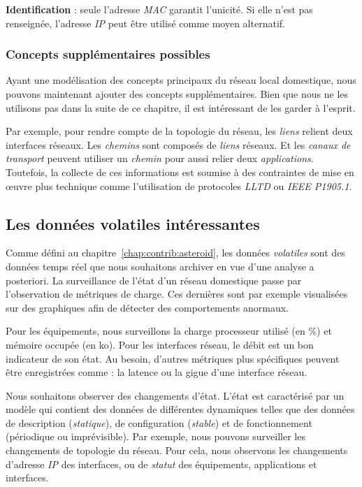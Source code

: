 \textbf{Identification} : seule l'adresse \textit{MAC} garantit l'unicité. Si elle n'est pas renseignée, l'adresse \textit{IP} peut être utilisé comme moyen alternatif.

\subsubsection{Concepts supplémentaires possibles}
Ayant une modélisation des concepts principaux du réseau local domestique, nous pouvons maintenant ajouter des concepts supplémentaires. Bien que nous ne les utilisons pas dans la suite de ce chapitre, il est intéressant de les garder à l'esprit.

Par exemple, pour rendre compte de la topologie du réseau, les \textit{liens} relient deux interfaces réseaux. Les \textit{chemins} sont composés de \textit{liens} réseaux. Et les \textit{canaux de transport} peuvent utiliser un \textit{chemin} pour aussi relier deux \textit{applications}. Toutefois, la collecte de ces informations est soumise à des contraintes de mise en œuvre plus technique comme l'utilisation de protocoles \textit{LLTD} ou \textit{IEEE P1905.1}.

\subsection{Les données volatiles intéressantes}
Comme défini au chapitre~\ref{chap:contrib:asteroid}, les données \textit{volatiles} sont des données temps réel que nous souhaitons archiver en vue d'une analyse a posteriori. La surveillance de l'état d'un réseau domestique passe par l'observation de métriques de charge. Ces dernières sont par exemple visualisées sur des graphiques afin de détecter des comportements anormaux.

Pour les équipements, nous surveillons la charge processeur utilisé (en \%) et mémoire occupée (en ko). Pour les interfaces réseau, le débit est un bon indicateur de son état. Au besoin, d'autres métriques plus spécifiques peuvent être enregistrées comme : la latence ou la gigue d'une interface réseau.

Nous souhaitons observer des changements d'état. L'état est caractérisé par un modèle qui contient des données de différentes dynamiques telles que des données de description (\textit{statique}), de configuration (\textit{stable}) et de fonctionnement (périodique ou imprévisible). Par exemple, nous pouvons surveiller les changements de topologie du réseau. Pour cela, nous observons les changements d'adresse \textit{IP} des interfaces, ou de \textit{statut} des équipements, applications et interfaces.

